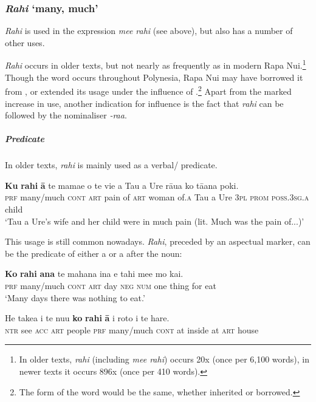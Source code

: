 \subsubsection{\textit{Rahi}\textit{} ‘many, much’}\label{sec:4.4.7.2}
\textit{Rahi} is used in the expression \textit{me{\ꞌ}e rahi} (see above), but also has a number of other uses.

\textit{Rahi} occurs in older texts, but not nearly as frequently as in modern Rapa Nui.\footnote{\label{fn:185}In older texts, \textit{rahi} (including \textit{me{\ꞌ}e rahi}) occurs 20x (once per 6,100 words), in newer texts it occurs 896x (once per 410 words).} Though the word occurs throughout Polynesia, Rapa Nui may have borrowed it from , or extended its usage under the influence of .\footnote{\label{fn:186}The form of the word would be the same, whether inherited or borrowed.}  Apart from the marked increase in use, another indication for  influence is the fact that \textit{rahi} can be followed by the  nominaliser \textit{-ra{\ꞌ}a}. 

\subparagraph{Predicate} In older texts, \textit{rahi} is mainly used as a verbal/ predicate.

\ea\label{ex:4.94}
\gll \textbf{Ku} \textbf{rahi} \textbf{{\ꞌ}ā} te mamae o te vi{\ꞌ}e {\ꞌ}a Tau {\ꞌ}a Ure rāua ko  tā{\ꞌ}ana poki.\\
\textsc{prf} many/much \textsc{cont} \textsc{art} pain of \textsc{art} woman of\textsc{.a} Tau a Ure \textsc{3pl} \textsc{prom}  \textsc{poss.3sg.a} child\\

\glt
‘Tau a Ure’s wife and her child were in much pain (lit. Much was the pain of...)’ \textstyleExampleref{[Ley-9-63.019]}
\z

This usage is still common nowadays. \textit{Rahi}, preceded by an aspectual marker, can be the predicate of either a  or a  after the noun:

\ea\label{ex:4.95}
\gll \textbf{Ko} \textbf{rahi} \textbf{{\ꞌ}ana} te mahana {\ꞌ}ina e tahi me{\ꞌ}e mo kai. \\
\textsc{prf} many/much \textsc{cont} \textsc{art} day \textsc{neg} \textsc{num} one thing for eat \\

\glt 
‘Many days there was nothing to eat.’ \textstyleExampleref{[R303.029]} 
\z

\ea\label{ex:4.96}
\gll He take{\ꞌ}a i te nu{\ꞌ}u \textbf{ko} \textbf{rahi} \textbf{{\ꞌ}ā} {\ꞌ}i roto i te hare. \\
\textsc{ntr} see \textsc{acc} \textsc{art} people \textsc{prf} many/much \textsc{cont} at inside at \textsc{art} house \\


